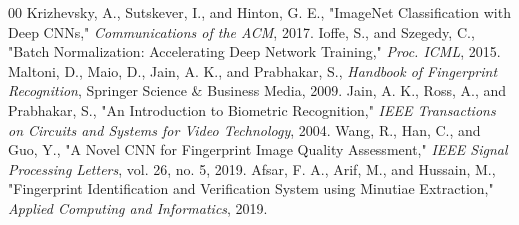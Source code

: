 \documentclass[conference]{IEEEtran}
\begin{document}
\begin{thebibliography}{00}
 Krizhevsky, A., Sutskever, I., and Hinton, G. E., "ImageNet Classification with Deep CNNs," \textit{Communications of the ACM}, 2017.
 Ioffe, S., and Szegedy, C., "Batch Normalization: Accelerating Deep Network Training," \textit{Proc. ICML}, 2015.
 Maltoni, D., Maio, D., Jain, A. K., and Prabhakar, S., \textit{Handbook of Fingerprint Recognition}, Springer Science \& Business Media, 2009.
 Jain, A. K., Ross, A., and Prabhakar, S., "An Introduction to Biometric Recognition," \textit{IEEE Transactions on Circuits and Systems for Video Technology}, 2004.
 Wang, R., Han, C., and Guo, Y., "A Novel CNN for Fingerprint Image Quality Assessment," \textit{IEEE Signal Processing Letters}, vol. 26, no. 5, 2019.
 Afsar, F. A., Arif, M., and Hussain, M., "Fingerprint Identification and Verification System using Minutiae Extraction," \textit{Applied Computing and Informatics}, 2019.

\end{thebibliography}
\end{document}
